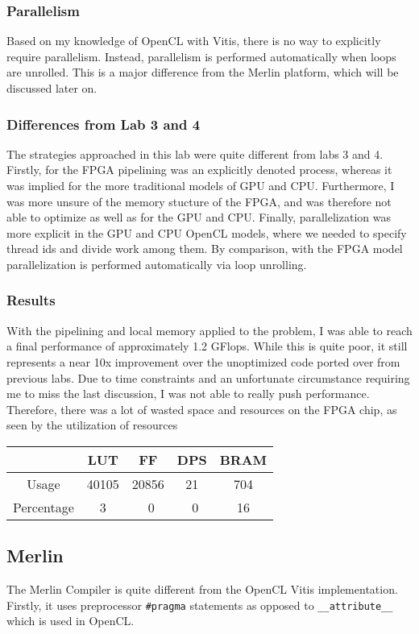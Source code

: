 \documentclass[letterpaper,twocolumn,10pt]{article}
\def\code#1{\texttt{#1}}
\begin{document}
\subsubsection{Parallelism}
Based on my knowledge of OpenCL with Vitis, there is no way to explicitly
require parallelism. Instead, parallelism is performed automatically when loops
are unrolled. This is a major difference from the Merlin platform, which will
be discussed later on.
\subsubsection{Differences from Lab 3 and 4}
The strategies approached in this lab were quite different from labs 3 and 4.
Firstly, for the FPGA pipelining was an explicitly denoted process, whereas it
was implied for the more traditional models of GPU and CPU. Furthermore, I was
more unsure of the memory stucture of the FPGA, and was therefore not able to
optimize as well as for the GPU and CPU. Finally, parallelization was more
explicit in the GPU and CPU OpenCL models, where we needed to specify thread
ids and divide work among them. By comparison, with the FPGA model
parallelization is performed automatically via loop unrolling.
\subsubsection{Results}
With the pipelining and local memory applied to the problem, I was able to
reach a final performance of approximately 1.2 GFlops. While this is quite
poor, it still represents a near 10x improvement over the unoptimized code
ported over from previous labs. Due to time constraints and an unfortunate
circumstance requiring me to miss the last discussion, I was not able to really
push performance. Therefore, there was a lot of wasted space and resources on
the FPGA chip, as seen by the utilization of resources
\begin{center}
    \begin{tabular}{|c|c|c|c|c|}
        \hline
        & LUT & FF & DPS & BRAM \\ \hline
        Usage & 40105 & 20856 & 21 & 704 \\ \hline
        Percentage & 3 & ~0 & ~0 & 16 \\ \hline
    \end{tabular}
\end{center}
\subsection{Merlin}
The Merlin Compiler is quite different from the OpenCL Vitis implementation.
Firstly, it uses preprocessor \code{\#pragma} statements as opposed to
\code{\_\_attribute\_\_} which is used in OpenCL.
\end{document}
